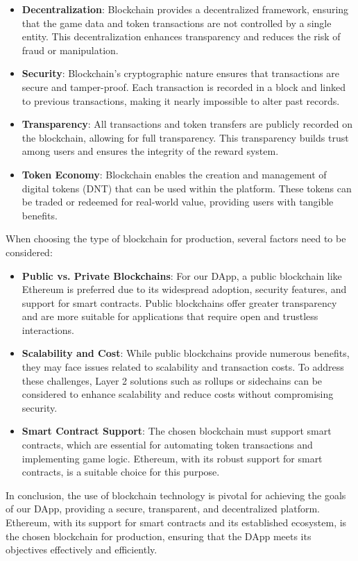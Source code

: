 \documentclass[main.tex]{subfiles}
\begin{document}
\begin{itemize}
    \item \textbf{Decentralization}: Blockchain provides a decentralized framework, ensuring that the game data and token transactions are not controlled by a single entity. This decentralization enhances transparency and reduces the risk of fraud or manipulation.
    \item \textbf{Security}: Blockchain's cryptographic nature ensures that transactions are secure and tamper-proof. Each transaction is recorded in a block and linked to previous transactions, making it nearly impossible to alter past records.
    \item \textbf{Transparency}: All transactions and token transfers are publicly recorded on the blockchain, allowing for full transparency. This transparency builds trust among users and ensures the integrity of the reward system.
    \item \textbf{Token Economy}: Blockchain enables the creation and management of digital tokens (DNT) that can be used within the platform. These tokens can be traded or redeemed for real-world value, providing users with tangible benefits.
\end{itemize}

When choosing the type of blockchain for production, several factors need to be considered:

\begin{itemize}
    \item \textbf{Public vs. Private Blockchains}: For our DApp, a public blockchain like Ethereum is preferred due to its widespread adoption, security features, and support for smart contracts. Public blockchains offer greater transparency and are more suitable for applications that require open and trustless interactions.
    \item \textbf{Scalability and Cost}: While public blockchains provide numerous benefits, they may face issues related to scalability and transaction costs. To address these challenges, Layer 2 solutions such as rollups or sidechains can be considered to enhance scalability and reduce costs without compromising security.
    \item \textbf{Smart Contract Support}: The chosen blockchain must support smart contracts, which are essential for automating token transactions and implementing game logic. Ethereum, with its robust support for smart contracts, is a suitable choice for this purpose.
\end{itemize}

In conclusion, the use of blockchain technology is pivotal for achieving the goals of our DApp, providing a secure, transparent, and decentralized platform. Ethereum, with its support for smart contracts and its established ecosystem, is the chosen blockchain for production, ensuring that the DApp meets its objectives effectively and efficiently.
\end{document}
